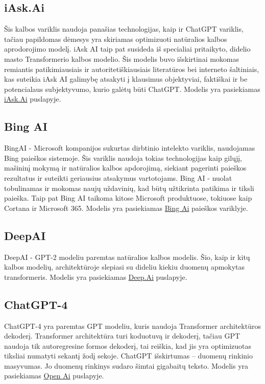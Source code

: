 \documentclass[conference]{IEEEtran}
\begin{document}
\subsection{iAsk.Ai}
Šis kalbos variklis naudoja panašias technologijas, kaip ir ChatGPT variklis, tačiau
papildomas dėmesys yra skiriamas optimizuoti natūralios kalbos aprodorojimo modelį. \cite{iaskai} iAsk AI taip pat susideda iš specialiai pritaikyto,
didelio masto Transformerio kalbos modelio. Šis modelis buvo išskirtinai mokomas remiantis
patikimiausiais ir autoritetiškiausiais literatūros bei interneto šaltiniais,
kas suteikia iAsk AI galimybę atsakyti į klausimus objektyviai,
faktiškai ir be potencialaus subjektyvumo, kurio galėtų būti ChatGPT. Modelis yra pasiekiamas 
\href{https://iask.ai/}{iAsk.Ai} puslapyje.

\subsection{Bing AI}
BingAI - Microsoft kompanijos sukurtas dirbtinio intelekto variklis, naudojamas Bing paieškos sistemoje. \cite{bing} Šis variklis naudoja tokias technologijas kaip gilųjį, mašininį mokymą ir natūralios kalbos apdorojimą, siekiant pagerinti paieškos rezultatus ir suteikti geriausius atsakymus vartotojams. Bing AI - nuolat tobulinamas ir mokomas naujų uždavinių, kad būtų užtikrinta patikima ir tiksli paieška. Taip pat Bing AI taikoma kitose Microsoft produktuose, tokiuose kaip Cortana ir Microsoft 365. Modelis yra pasiekiamas 
\href{https://www.bing.com/?/ai/}{Bing Ai} paieškos variklyje.

\subsection{DeepAI}
DeepAI - GPT-2 modeliu paremtas natūralios kalbos modelis. \cite{deepai} Šio, kaip ir kitų kalbos modelių, architektūroje slepiasi su dideliu kiekiu duomenų apmokytas transformeris. Modelis yra pasiekiamas 
\href{https://deep.ai/}{Deep.Ai} puslapyje.

\subsection{ChatGPT-4}
ChatGPT-4 yra paremtas GPT modeliu, kuris naudoja Transformer architektūros dekoderį.\cite{chatgpt} Transformer architektūra turi koduotuvą ir dekoderį, tačiau GPT naudoja tik autoregresine formos dekoderį, tai reiškia, kad jis yra optimizuotas tiksliai numatyti sekantį žodį sekoje. ChatGPT išskirtumas – duomenų rinkinio masyvumas. Jo duomenų rinkinys sudaro šimtai gigabaitų teksto. Modelis yra pasiekiamas 
\href{https://chat.openai.lt}{Open Ai} puslapyje.
\end{document}
